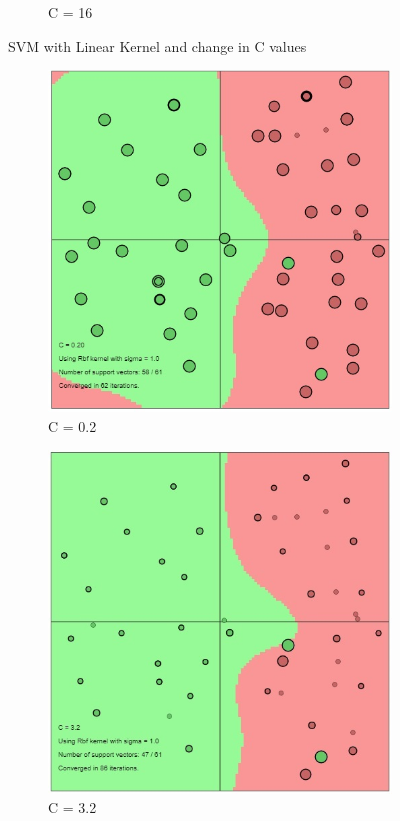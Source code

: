 {\begin{figure}[!ht]
\begin{subfigure}{.32\textwidth}
		\caption{C = 16}
		\label{fig:C16}
	\end{subfigure}
	\caption{SVM with Linear Kernel and change in C values}
	\label{fig:C}
\end{figure}

\begin{figure}[!ht] 
	\centering
	\begin{subfigure}{.32\textwidth}
		\centering
		\includegraphics[width=.65\linewidth]{Exercise1/Report/RBF_C(0.2).jpg}
		\caption{C = 0.2}
		\label{fig:RBF0.2}
	\end{subfigure}%
	\begin{subfigure}{.32\textwidth}
		\centering
		\includegraphics[width=.65\linewidth]{Exercise1/Report/RBF_C(3.2).jpg}
		\caption{C = 3.2}
		\label{fig:RBF3.2}
	\end{subfigure}
	\begin{subfigure}{.32\textwidth}
		\centering

\end{subfigure}
\end{figure}}
